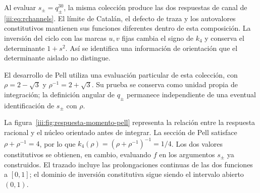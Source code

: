 Al evaluar $s_\pm=q_\pm^{30}$, la misma colección produce las dos respuestas
de canal de \eqref{iii:eq:rchannels}. El límite de Catalán, el defecto de
traza y los autovalores constitutivos mantienen sus funciones diferentes
dentro de esta composición. La inversión del ciclo con las marcas $u,v$
fijas cambia el signo de $k_4$ y conserva el determinante $1+s^2$.
Así se identifica una información de orientación que el determinante
aislado no distingue.

El desarrollo de Pell utiliza una evaluación particular de esta colección,
con $\rho=2-\sqrt3$ y $\rho^{-1}=2+\sqrt3$. Su prueba se conserva como
unidad propia de integración; la definición angular de $q_\pm$ permanece
independiente de una eventual identificación de $s_\pm$ con $\rho$.

La figura~\ref{iii:fig:respuesta-momento-pell} representa la relación entre
la respuesta racional y el núcleo orientado antes de integrar. La sección
de Pell satisface $\rho+\rho^{-1}=4$, por lo que
$k_4(\rho)=(\rho+\rho^{-1})^{-1}=1/4$. Los dos valores constitutivos
se obtienen, en cambio, evaluando $f$ en los argumentos $s_\pm$ ya
construidos. El trazado incluye las prolongaciones continuas de las dos
funciones a $[0,1]$; el dominio de inversión constitutiva sigue siendo
el intervalo abierto $(0,1)$.

